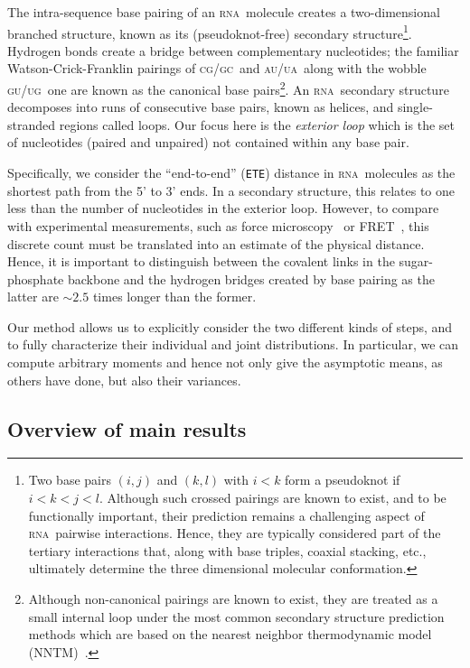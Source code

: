 \documentclass{article}
\newcommand{\RNA}{\textsc{rna}}
\newcommand{\A}{\textsc{a}}
\newcommand{\C}{\textsc{c}}
\newcommand{\G}{\textsc{g}}
\newcommand{\U}{\textsc{u}}
\newcommand{\ETE}{{\tt ETE}}
\begin{document}
The intra-sequence base pairing of an \RNA\ molecule creates  
a two-dimensional branched structure, known as its (pseudoknot-free)
secondary structure\footnote{
Two base pairs $(i,j)$ and $(k,l)$ with $i < k$ form a pseudoknot 
if $i < k < j < l$.
Although such crossed pairings are known to exist, 
and to be functionally important,
their prediction remains a challenging aspect of \RNA\ pairwise interactions.
Hence, they are typically considered part of the tertiary interactions
that, along with base triples, coaxial stacking, etc., ultimately 
determine the three dimensional molecular conformation.
}.
Hydrogen bonds create a bridge between complementary nucleotides;
the familiar Watson-Crick-Franklin pairings of \C\G/\G\C\ and \A\U/\U\A\ 
along with the wobble \G\U/\U\G\ one are known as the canonical 
base pairs\footnote{
Although non-canonical pairings are known to exist, they are 
treated as a small internal loop under the most common secondary 
structure prediction methods which are based on the nearest
neighbor thermodynamic model (NNTM)~\cite{Turner:2009}.
}.
An \RNA\ secondary structure decomposes into runs of consecutive 
base pairs, known as helices, and single-stranded regions called 
loops.
Our focus here is the \emph{exterior loop} which is the 
set of nucleotides (paired and unpaired) not contained within any 
base pair.

Specifically, we consider the ``end-to-end'' (\ETE) distance in \RNA\ 
molecules as the shortest path from the 5' to 3' ends.
In a secondary structure, this relates to one less than
the number of nucleotides in the exterior loop.
However, to compare with experimental measurements, such as 
force microscopy~\cite{Gerland:2001} or 
FRET~\cite{Leija-Martinez:2014,Lai:2018}, 
this discrete count must be 
translated into an estimate of the physical distance.
Hence, it is important to distinguish between the covalent links 
in the sugar-phosphate backbone and the hydrogen bridges created by
base pairing as the latter are $\sim2.5$ times longer than the former.

Our method allows us to explicitly consider the two different
kinds of steps, and to fully characterize their individual and 
joint distributions.
In particular, we can compute arbitrary moments and hence
not only give the asymptotic means, as others have done,
but also their variances.

\subsection{Overview of main results}
\end{document}
